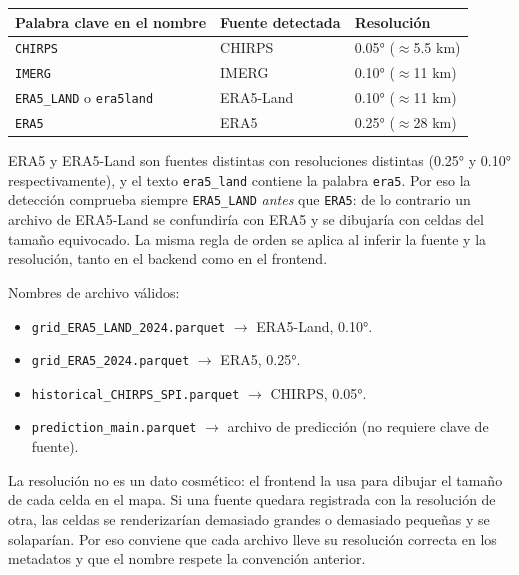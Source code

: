 \begin{center}
\small
\begin{tabular}{@{}lll@{}}
\toprule
\textbf{Palabra clave en el nombre} & \textbf{Fuente detectada} & \textbf{Resolución} \\
\midrule
\texttt{CHIRPS}                         & CHIRPS    & 0.05° ($\approx$5.5 km) \\
\texttt{IMERG}                          & IMERG     & 0.10° ($\approx$11 km) \\
\texttt{ERA5\_LAND} o \texttt{era5land} & ERA5-Land & 0.10° ($\approx$11 km) \\
\texttt{ERA5}                           & ERA5      & 0.25° ($\approx$28 km) \\
\bottomrule
\end{tabular}
\end{center}

\begin{remark}
ERA5 y ERA5-Land son fuentes distintas con resoluciones distintas (0.25° y 0.10° respectivamente), y el texto \texttt{era5\_land} contiene la palabra \texttt{era5}. Por eso la detección comprueba siempre \texttt{ERA5\_LAND} \emph{antes} que \texttt{ERA5}: de lo contrario un archivo de ERA5-Land se confundiría con ERA5 y se dibujaría con celdas del tamaño equivocado. La misma regla de orden se aplica al inferir la fuente y la resolución, tanto en el backend como en el frontend.
\end{remark}

\begin{example}
Nombres de archivo válidos:
\begin{itemize}
    \item \texttt{grid\_ERA5\_LAND\_2024.parquet} $\to$ ERA5-Land, 0.10°.
    \item \texttt{grid\_ERA5\_2024.parquet} $\to$ ERA5, 0.25°.
    \item \texttt{historical\_CHIRPS\_SPI.parquet} $\to$ CHIRPS, 0.05°.
    \item \texttt{prediction\_main.parquet} $\to$ archivo de predicción (no requiere clave de fuente).
\end{itemize}
\end{example}

\begin{remark}
La resolución no es un dato cosmético: el frontend la usa para dibujar el tamaño de cada celda en el mapa. Si una fuente quedara registrada con la resolución de otra, las celdas se renderizarían demasiado grandes o demasiado pequeñas y se solaparían. Por eso conviene que cada archivo lleve su resolución correcta en los metadatos y que el nombre respete la convención anterior.
\end{remark}


